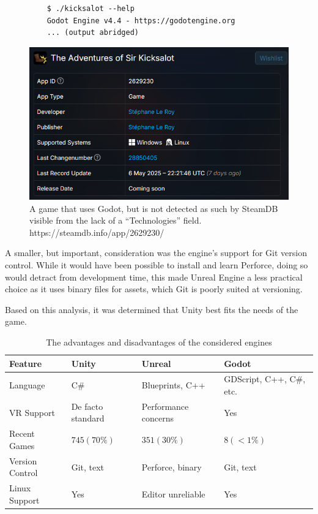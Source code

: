 \documentclass[sigconf,authordraft]{acmart}
\begin{document}
\begin{figure}[h]
  \begin{lstlisting}
    $ ./kicksalot --help
    Godot Engine v4.4 - https://godotengine.org
    ... (output abridged)
  \end{lstlisting}
  \includegraphics[width=0.8\linewidth]{godot-false-negative.png}
  \caption{\label{fig:godot_false_negative} A game that uses Godot, but is not
    detected as such by SteamDB visible from the lack of a ``Technologies''
    field. https://steamdb.info/app/2629230/}
\end{figure}

A smaller, but important, consideration was the engine's support for Git version
control. While it would have been possible to install and learn Perforce, doing
so would detract from development time, this made Unreal Engine a less practical
choice as it uses binary files for assets, which Git is poorly suited at
versioning.

Based on this analysis, it was determined that Unity best fits the needs of the
game.

\begin{table}
  \caption{The advantages and disadvantages of the considered engines}
  \label{table:engine_compare}
  \begin{tabular}{llll}\toprule
    Feature & Unity & Unreal & Godot \\\midrule

    Language & C\# & Blueprints, C++ & GDScript, C++, C\#, etc. \\
    VR Support & De facto standard & Performance concerns & Yes \\
    Recent Games & $745 (70\%)$ & $351 (30\%)$ & $8 (<1\%)$ \\
    Version Control & Git, text & Perforce, binary & Git, text \\
    Linux Support & Yes & Editor unreliable & Yes \\

    \bottomrule
  \end{tabular}
\end{table}
\end{document}
